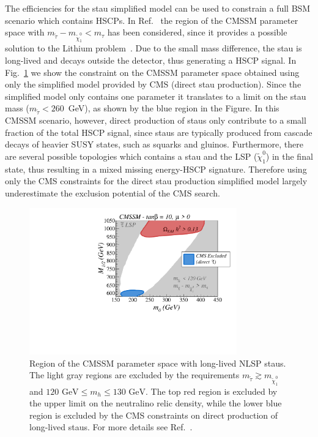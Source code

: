 The efficiencies for the stau simplified model
can be used to constrain a full BSM scenario which contains
HSCPs. In Ref.~\cite{Heisig:2015yla} the region of the CMSSM parameter
space with $m_{\tilde \tau} - m_{\tilde \chi_1^0} < m_{\tau}$ has been
considered, since it provides a possible solution to the Lithium
problem~\cite{Spite:1982dd, Cyburt:2008kw}. Due to the small
mass difference, the stau is long-lived and decays outside the detector,
thus generating a HSCP signal.
In Fig.~\ref{fig:cmssmA} we show the constraint on the CMSSM parameter
space obtained using only the simplified model provided by CMS (direct stau
production).
Since the simplified model only contains one parameter it
translates to a limit on the stau mass ($m_{\tilde \tau} < 260$~GeV),
as shown by the blue region in the Figure.
In this CMSSM scenario, however, direct production of staus only contribute to a
small fraction of the total HSCP signal, since staus are typically produced from
cascade decays of heavier SUSY states, such as squarks and gluinos.
Furthermore, there are several possible topologies which contains a stau and the
LSP ($\tilde \chi_1^0$) in the final state, thus resulting in a
mixed missing energy-HSCP signature.
Therefore using only the CMS constraints for the direct stau production
simplified model largely underestimate the exclusion potential of the CMS
search. 


\begin{figure}[!h]
\centering
\includegraphics[width=0.8\textwidth]{ch5-figures/sms_exclusion_direct.pdf}
\caption{Region of the CMSSM parameter space with long-lived NLSP staus.
The light gray regions are excluded by the requirements $m_{\tilde \tau} \gtrsim
m_{\tilde \chi_1^0}$ and $ 120 \mbox{ GeV} \leq m_h \leq 130 \mbox{ GeV}$.
The top red region is excluded by the upper limit on the neutralino relic
density, while the lower blue region is excluded by the CMS constraints
on direct production of long-lived staus. For more details see Ref.~\cite{Heisig:2015yla}.
}
\label{fig:cmssmA}
\end{figure}


